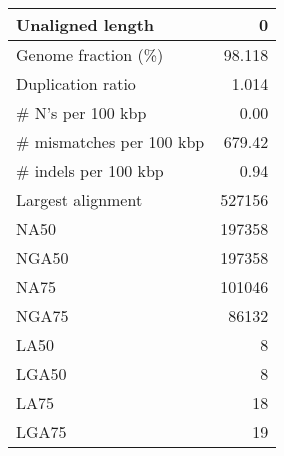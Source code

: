 \documentclass[12pt,a4paper]{article}
\begin{document}
\begin{table}[ht]
\begin{center}
\begin{tabular}{|l*{1}{|r}|}
Unaligned length & 0 \\ \hline
Genome fraction (\%) & 98.118 \\ \hline
Duplication ratio & 1.014 \\ \hline
\# N's per 100 kbp & 0.00 \\ \hline
\# mismatches per 100 kbp & 679.42 \\ \hline
\# indels per 100 kbp & 0.94 \\ \hline
Largest alignment & 527156 \\ \hline
NA50 & 197358 \\ \hline
NGA50 & 197358 \\ \hline
NA75 & 101046 \\ \hline
NGA75 & 86132 \\ \hline
LA50 & 8 \\ \hline
LGA50 & 8 \\ \hline
LA75 & 18 \\ \hline
LGA75 & 19 \\ \hline
\end{tabular}
\end{center}
\end{table}
\end{document}
